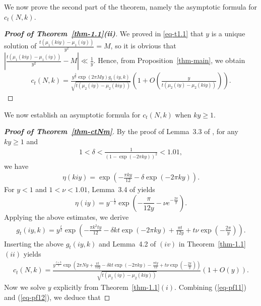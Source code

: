 \documentclass[11pt]{amsart}
\theoremstyle{plain}
\numberwithin{equation}{section}
\begin{document}
	We now prove the second part of the theorem, namely the asymptotic formula for $c_t(N,k)$.
	\begin{proof}[\textbf{\boldmath Proof of Theorem~\ref{thm-1.1}(ii)}]
		We proved in \eqref{eq-t1.1} that $y$ is a unique solution of $\frac{t(\mu_{1}(kiy)-\mu_1(iy))}{y^{2}}=M$, so it is obvious that $\left|\frac{t(\mu_{1}(kiy)-\mu_1(iy))}{y^{2}}-M\right|\ll\frac{1}{y}$. Hence, from Proposition~\ref{thm-main}, we obtain
		\begin{align*}
			c_t(N,k)=\frac{y^{\frac{3}{2}}\exp(2\pi My)g_{t}(iy,k)}{\sqrt{t(\mu_{2}(iy)-\mu_2(kiy))}}\left(1+O\left(\frac{y}{t(\mu_{2}(iy)-\mu_2(kiy))}\right)\right).    
		\end{align*}
	\end{proof}
	We now establish an asymptotic formula for $c_t(N,k)$ when $ky\ge 1$.
	\begin{proof}[\textbf{\boldmath Proof of Theorem~\ref{thm-ctNm}}]
		By the proof of Lemma~3.3 of \cite{barman1}, for any $ky\ge 1$ and 
		\begin{align}\label{eq-delta}
			1<\delta<\frac{1}{(1-\exp(-2\pi ky))^{2}}<1.01,
		\end{align}
		we have
		\begin{align*}%
			\eta(kiy)=\exp\left(-\frac{\pi ky}{12}-\delta\exp\left(-2\pi ky\right)\right). 
		\end{align*}
		For $y < 1$ and $1 < \nu < 1.01$, Lemma~3.4 of \cite{barman1} yields
		\begin{equation*}
			\eta(iy) = y^{-\frac{1}{2}} \exp\left( -\frac{\pi}{12y} - \nu e^{-\frac{2\pi}{y}} \right).
		\end{equation*}
		Applying the above estimates, we derive
		\begin{align*}
			g_t(iy,k)=y^{\frac{t}{2}}\exp\left(-\frac{\pi k^{2}ty}{12}-\delta kt\exp(-2\pi ky)+\frac{\pi t}{12y}+t\nu\exp\left(-\frac{2\pi }{y}\right)\right).   
		\end{align*}
		Inserting the above $g_t(iy,k)$ and Lemma~4.2 of \cite{tyler}$(iv)$ in Theorem~\ref{thm-1.1}$(ii)$ yields
		\begin{align}\label{eq-ctN2}
			c_t(N,k)= \frac{y^{\frac{t+3}{2}}\exp\left(2\pi Ny+\frac{\pi t}{12y}-\delta kt\exp(-2\pi ky)-\frac{\pi ty}{12}+t\nu\exp\left(-\frac{2\pi }{y}\right)\right)}{\sqrt{t(\mu_2(iy)-\mu_2(kiy))}}\left(1+O\left(y\right)\right). 
		\end{align}
		Now we solve $y$ explicitly from Theorem~\ref{thm-1.1}$(i)$. Combining (\ref{eq-pf11}) and (\ref{eq-pf12}), we deduce that

\end{proof}
\end{document}
